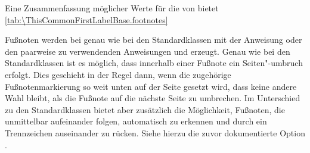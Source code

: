Eine Zusammenfassung möglicher Werte für die  von
 bietet
\autoref{tab:\ThisCommonFirstLabelBase.footnotes}%
%
%
\EndIndexGroup


\begin{Declaration}
\end{Declaration}%
Fußnoten werden bei {\KOMAScript} genau wie bei den Standardklassen mit der
Anweisung  oder den paarweise zu verwendenden Anweisungen
 und  erzeugt.  Genau wie bei den
Standardklassen ist es möglich, dass innerhalb einer Fußnote ein
Seiten"-umbruch erfolgt. Dies geschieht in der Regel dann, wenn die zugehörige
Fußnotenmarkierung so weit unten auf der Seite gesetzt wird, dass keine andere
Wahl bleibt, als die Fußnote auf die nächste Seite zu umbrechen. Im
Unterschied%
zu den Standardklassen bietet \KOMAScript{} aber zusätzlich die Möglichkeit,
Fußnoten, die unmittelbar aufeinander folgen, automatisch zu erkennen und
durch ein Trennzeichen auseinander zu
rücken. Siehe hierzu
die zuvor dokumentierte Option
.

